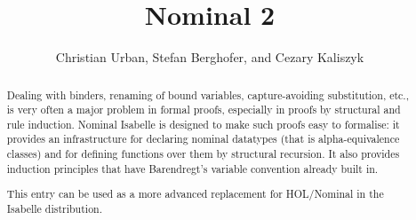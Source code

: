 \documentclass[11pt,a4paper]{article}
\begin{document}
\title{Nominal 2}
\author{Christian Urban, Stefan Berghofer, and Cezary Kaliszyk}
\maketitle

\begin{abstract}
  Dealing with binders, renaming of bound variables, capture-avoiding
  substitution, etc., is very often a major problem in formal
  proofs, especially in proofs by structural and rule
  induction. Nominal Isabelle is designed to make such proofs easy to
  formalise: it provides an infrastructure for declaring nominal
  datatypes (that is alpha-equivalence classes) and for defining
  functions over them by structural recursion. It also provides
  induction principles that have Barendregt’s variable convention
  already built in.

  This entry can be used as a more advanced replacement for
  HOL/Nominal in the Isabelle distribution.
\end{abstract}

\tableofcontents





\end{document}
